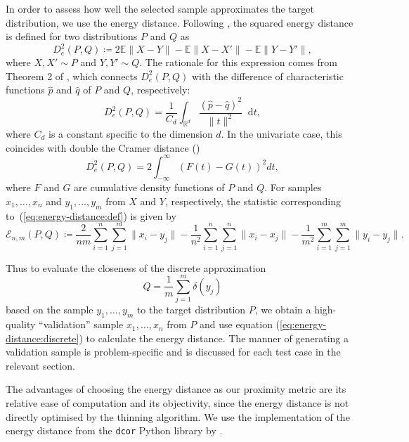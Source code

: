 \documentclass[11pt,a4paper]{report}
\newcommand*\diff{\mathop{}\!\mathrm{d}}
\begin{document}
In order to assess how well the selected sample approximates the target distribution, we use the energy distance. Following \cite{rizzoEnergyDistance2016}, the squared energy distance is defined for two distributions $P$ and $Q$ as
\begin{equation}
D^2_e(P, Q) \coloneq 2 \mathbb{E} \|X - Y\| - \mathbb{E}\|X - X'\| - \mathbb{E} \|Y - Y'\|,
\label{eq:energy-distance:def}
\end{equation}
where $X, X' \sim P$ and $Y, Y' \sim Q$. The rationale for this expression comes from Theorem 2 of \cite{szekelyEstatisticsEnergyStatistical2002}, which connects $D^2_e(P, Q)$ with the difference of characteristic functions $\hat{p}$ and $\hat{q}$ of $P$ and $Q$, respectively:
\begin{equation*}
D^2_e(P, Q) = \frac{1}{C_d} \int_{\mathbb{R}^d} \frac{(\hat{p} - \hat{q})^2}{\|t\|^2} \diff t,
\end{equation*}
where $C_d$ is a constant specific to the dimension $d$. In the univariate case, this coincides with double the Cramer distance (\cite{cramerCompositionElementaryErrors1928})
\begin{equation*}
D^2_e(P, Q) = 2 \int_{-\infty}^{\infty} (F(t) - G(t))^2 dt,
\end{equation*}
where $F$ and $G$ are cumulative density functions of $P$ and $Q$.
For samples $x_1, \dots, x_n$ and $y_1, \dots, y_m$ from $X$ and $Y$, respectively, the statistic corresponding to~(\ref{eq:energy-distance:def}) is given by
\begin{equation*}
\mathcal{E}_{n,m}(P, Q) \coloneq \frac{2}{nm}\sum_{i=1}^n \sum_{j=1}^m \|x_i - y_j\| - \frac{1}{n^2} \sum_{i=1}^n\sum_{j=1}^n \|x_i - x_j\| - \frac{1}{m^2} \sum_{i=1}^m \sum_{j=1}^m \|y_i - y_j\|.
\label{eq:energy-distance:discrete}
\end{equation*}

Thus to evaluate the closeness of the discrete approximation
\begin{equation*}
Q = \frac{1}{m} \sum_{j=1}^m \delta(y_j)
\end{equation*}
based on the sample $y_1, \dots, y_m$ to the target distribution $P$, we obtain a high-quality ``validation'' sample $x_1, \dots, x_n$ from $P$ and use equation (\ref{eq:energy-distance:discrete}) to calculate the energy distance. The manner of generating a validation sample is problem-specific and is discussed for each test case in the relevant section.

The advantages of choosing the energy distance as our proximity metric are its relative ease of computation and its objectivity, since the energy distance is not directly optimised by the thinning algorithm. We use the implementation of the energy distance from the \texttt{dcor} Python library by \cite{ramos-carrenoDcorDistanceCorrelation2023}.
\end{document}
